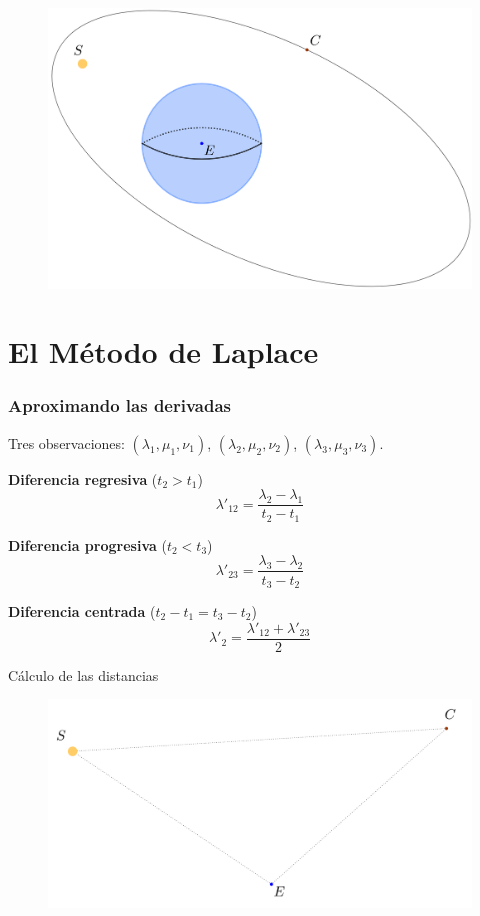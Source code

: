 \documentclass{beamer}
\begin{document}
\begin{frame}
\begin{figure}[H]
\centering
\includegraphics[scale=0.15]{images/problem_construct_3.png}
\end{figure}
\end{frame}


\section{El Método de Laplace}

\begin{frame}
\frametitle{Aproximando las derivadas}
Tres observaciones: $(\lambda_1,\mu_1,\nu_1)$, $(\lambda_2,\mu_2,\nu_2)$, $(\lambda_3,\mu_3,\nu_3)$.\pause
\vspace{0.66666cm}

\textbf{Diferencia regresiva} ($t_2>t_1$)
\[
\lambda'_{12}=\frac{\lambda_2-\lambda_1}{t_2-t_1}
\]

\textbf{Diferencia progresiva} ($t_2<t_3$)
\[
\lambda'_{23}=\frac{\lambda_3-\lambda_2}{t_3-t_2}
\]

\textbf{Diferencia centrada} ($t_2-t_1=t_3-t_2$)
\[
\lambda'_{2}=\frac{\lambda'_{12}+\lambda'_{23}}{2}
\]

\end{frame}

\begin{frame}{Cálculo de las distancias}
\begin{figure}[H]
\centering
\includegraphics[scale=0.2]{images/triangle_tfg.png}
\end{figure}
\end{frame}
\end{document}
